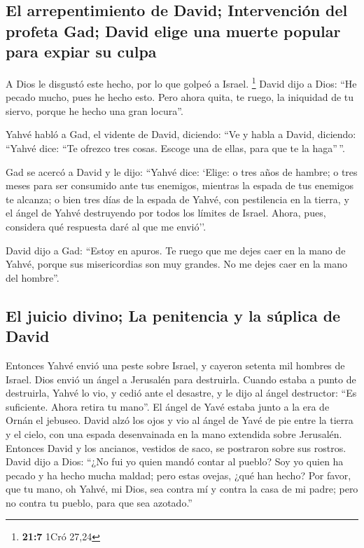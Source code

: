 \hypertarget{el-arrepentimiento-de-david-intervenciuxf3n-del-profeta-gad-david-elige-una-muerte-popular-para-expiar-su-culpa}{%
\subsection{El arrepentimiento de David; Intervención del profeta Gad;
David elige una muerte popular para expiar su
culpa}\label{el-arrepentimiento-de-david-intervenciuxf3n-del-profeta-gad-david-elige-una-muerte-popular-para-expiar-su-culpa}}

 A Dios le disgustó este hecho, por lo que golpeó a
Israel. \footnote{\textbf{21:7} 1Cró 27,24}  David dijo a
Dios: ``He pecado mucho, pues he hecho esto. Pero ahora quita, te ruego,
la iniquidad de tu siervo, porque he hecho una gran locura''.

 Yahvé habló a Gad, el vidente de David, diciendo:
 ``Ve y habla a David, diciendo: ``Yahvé dice: ``Te
ofrezco tres cosas. Escoge una de ellas, para que te la haga''\,''.

 Gad se acercó a David y le dijo: ``Yahvé dice: `Elige:
 o tres años de hambre; o tres meses para ser consumido
ante tus enemigos, mientras la espada de tus enemigos te alcanza; o bien
tres días de la espada de Yahvé, con pestilencia en la tierra, y el
ángel de Yahvé destruyendo por todos los límites de Israel. Ahora, pues,
considera qué respuesta daré al que me envió''.

 David dijo a Gad: ``Estoy en apuros. Te ruego que me
dejes caer en la mano de Yahvé, porque sus misericordias son muy
grandes. No me dejes caer en la mano del hombre''.

\hypertarget{el-juicio-divino-la-penitencia-y-la-suxfaplica-de-david}{%
\subsection{El juicio divino; La penitencia y la súplica de
David}\label{el-juicio-divino-la-penitencia-y-la-suxfaplica-de-david}}

 Entonces Yahvé envió una peste sobre Israel, y cayeron
setenta mil hombres de Israel.  Dios envió un ángel a
Jerusalén para destruirla. Cuando estaba a punto de destruirla, Yahvé lo
vio, y cedió ante el desastre, y le dijo al ángel destructor: ``Es
suficiente. Ahora retira tu mano''. El ángel de Yavé estaba junto a la
era de Ornán el jebuseo.  David alzó los ojos y vio al
ángel de Yavé de pie entre la tierra y el cielo, con una espada
desenvainada en la mano extendida sobre Jerusalén. Entonces David y los
ancianos, vestidos de saco, se postraron sobre sus rostros.
 David dijo a Dios: ``¿No fui yo quien mandó contar al
pueblo? Soy yo quien ha pecado y ha hecho mucha maldad; pero estas
ovejas, ¿qué han hecho? Por favor, que tu mano, oh Yahvé, mi Dios, sea
contra mí y contra la casa de mi padre; pero no contra tu pueblo, para
que sea azotado.''

